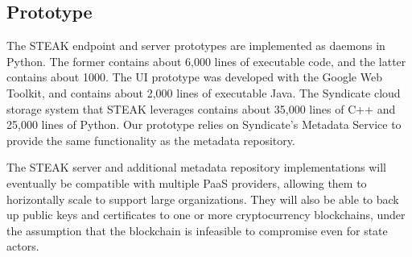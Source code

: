 \subsection{Prototype}
The STEAK endpoint and server prototypes are implemented as daemons in Python.  The former contains about 6,000 lines of executable code, and the latter contains about 1000.  The UI prototype was developed with the Google Web Toolkit, and contains about 2,000 lines of executable Java. The Syndicate cloud storage system that STEAK leverages contains about 35,000 lines of C++ and 25,000 lines of Python.  Our prototype relies on Syndicate’s Metadata Service to provide the same functionality as the metadata repository.

The STEAK server and additional metadata repository implementations will eventually be compatible with multiple PaaS providers, allowing them to horizontally scale to support large organizations.  They will also be able to back up public keys and certificates to one or more cryptocurrency blockchains, under the assumption that the blockchain is infeasible to compromise even for state actors.
